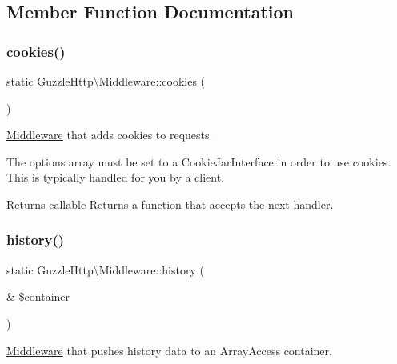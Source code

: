 \subsection{Member Function Documentation}
\mbox{\label{classGuzzleHttp_1_1Middleware_abb0cd141fa9bbd10ee7beda7c521a215}} 
\subsubsection{\texorpdfstring{cookies()}{cookies()}}
{\footnotesize\ttfamily static Guzzle\+Http\textbackslash{}\+Middleware\+::cookies (\begin{DoxyParamCaption}{ }\end{DoxyParamCaption})\hspace{0.3cm}{\ttfamily [static]}}

\hyperlink{classGuzzleHttp_1_1Middleware}{Middleware} that adds cookies to requests.

The options array must be set to a Cookie\+Jar\+Interface in order to use cookies. This is typically handled for you by a client.

\begin{DoxyReturn}{Returns}
callable Returns a function that accepts the next handler. 
\end{DoxyReturn}
\mbox{\label{classGuzzleHttp_1_1Middleware_a44a16ad53ee3186a658d4cc68289f890}} 
\subsubsection{\texorpdfstring{history()}{history()}}
{\footnotesize\ttfamily static Guzzle\+Http\textbackslash{}\+Middleware\+::history (\begin{DoxyParamCaption}\item[{\&}]{\$container }\end{DoxyParamCaption})\hspace{0.3cm}{\ttfamily [static]}}

\hyperlink{classGuzzleHttp_1_1Middleware}{Middleware} that pushes history data to an Array\+Access container.


